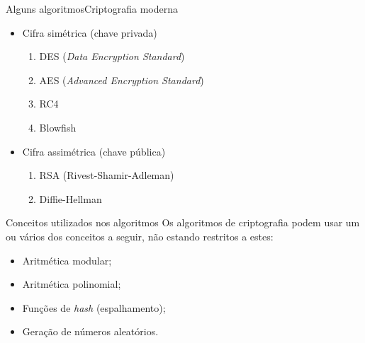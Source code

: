\begin{frame}{Alguns algoritmos}{Criptografia moderna}

  \begin{itemize}[<+-| alert@+>]
  \item Cifra simétrica (chave privada)
    \begin{enumerate}
    \item DES ({\it Data Encryption Standard})
    \item AES ({\it Advanced Encryption Standard})
    \item RC4
    \item Blowfish
    \end{enumerate}

  \item Cifra assimétrica (chave pública)
    \begin{enumerate}
    \item RSA (Rivest-Shamir-Adleman)
    \item Diffie-Hellman
    \end{enumerate}

  \end{itemize}
  
\end{frame}

\begin{frame}{Conceitos utilizados nos algoritmos}
  Os algoritmos de criptografia podem usar um ou vários dos conceitos
  a seguir, não estando restritos a estes:

  \begin{itemize}[<+-| alert@+>]
  \item Aritmética modular;
  \item Aritmética polinomial;
  \item Funções de {\it hash} (espalhamento);
  \item Geração de números aleatórios.
  \end{itemize}


\end{frame}

